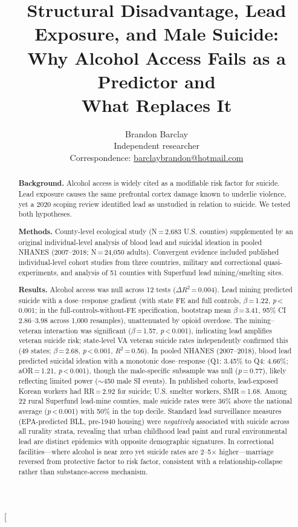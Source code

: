 \documentclass[11pt,twocolumn]{article}
\title{\textbf{Structural Disadvantage, Lead Exposure, and Male Suicide:\\Why Alcohol Access Fails as a Predictor and\\What Replaces It}}
\author{
    Brandon Barclay\\
    \small{Independent researcher}\\
    \small{Correspondence: \href{mailto:barclaybrandon@hotmail.com}{barclaybrandon@hotmail.com}}
}
\date{}
\begin{document}
\twocolumn[
\maketitle
\begin{@twocolumnfalse}
\begin{abstract}
\noindent\textbf{Background.} Alcohol access is widely cited as a modifiable risk factor for suicide. Lead exposure causes the same prefrontal cortex damage known to underlie violence, yet a 2020 scoping review identified lead as unstudied in relation to suicide. We tested both hypotheses.

\noindent\textbf{Methods.} County-level ecological study (N\,=\,2,683 U.S. counties) supplemented by an original individual-level analysis of blood lead and suicidal ideation in pooled NHANES (2007--2018; N\,=\,24,050 adults). Convergent evidence included published individual-level cohort studies from three countries, military and correctional quasi-experiments, and analysis of 51 counties with Superfund lead mining/smelting sites.

\noindent\textbf{Results.} Alcohol access was null across 12 tests ($\Delta R^2$\,=\,0.004). Lead mining predicted suicide with a dose--response gradient (with state FE and full controls, $\beta$\,=\,1.22, \textit{p}\,<\,0.001; in the full-controls-without-FE specification, bootstrap mean $\beta$\,=\,3.41, 95\% CI 2.86--3.98 across 1,000 resamples), unattenuated by opioid overdose. The mining--veteran interaction was significant ($\beta$\,=\,1.57, \textit{p}\,<\,0.001), indicating lead amplifies veteran suicide risk; state-level VA veteran suicide rates independently confirmed this (49 states; $\beta$\,=\,2.68, \textit{p}\,<\,0.001, $R^2$\,=\,0.56). In pooled NHANES (2007--2018), blood lead predicted suicidal ideation with a monotonic dose--response (Q1: 3.45\% to Q4: 4.66\%; aOR\,=\,1.21, \textit{p}\,<\,0.001), though the male-specific subsample was null (\textit{p}\,=\,0.77), likely reflecting limited power ($\sim$450 male SI events). In published cohorts, lead-exposed Korean workers had RR\,=\,2.92 for suicide; U.S. smelter workers, SMR\,=\,1.68. Among 22 rural Superfund lead-mine counties, male suicide rates were 36\% above the national average (\textit{p}\,<\,0.001) with 50\% in the top decile. Standard lead surveillance measures (EPA-predicted BLL, pre-1940 housing) were \textit{negatively} associated with suicide across all rurality strata, revealing that urban childhood lead paint and rural environmental lead are distinct epidemics with opposite demographic signatures. In correctional facilities---where alcohol is near zero yet suicide rates are 2--5$\times$ higher---marriage reversed from protective factor to risk factor, consistent with a relationship-collapse rather than substance-access mechanism.


\end{abstract}
\end{@twocolumnfalse}
\end{document}
